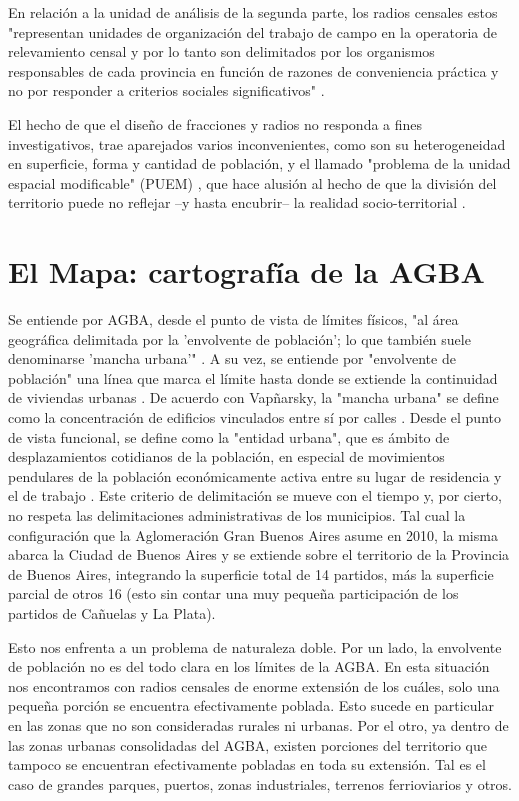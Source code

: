 En relación a la unidad de análisis de la segunda parte, los radios censales estos "representan unidades de organización del trabajo de campo en la operatoria de relevamiento censal y por lo tanto son delimitados por los organismos responsables de cada provincia en función de razones de conveniencia práctica y no por responder a criterios sociales significativos" \cite[p~630]{robirosa} . 

El hecho de que el diseño de fracciones y radios no responda a fines investigativos, trae aparejados varios inconvenientes, como son su heterogeneidad en superficie, forma y cantidad de población, y el llamado "problema de la unidad espacial modificable" (PUEM) \cite{openshaw1977,openshaw1984}, que hace alusión al hecho de que la división del territorio puede no reflejar –y hasta encubrir– la realidad socio-territorial \cite{marcos2012}. 



	\section{El Mapa: cartografía de la AGBA}\label{cap2-mapa}
	
Se entiende por AGBA, desde el punto de vista de límites físicos, "al área geográfica delimitada por la 'envolvente de población'; lo que también suele denominarse 'mancha urbana'" \cite{indec2003e}. A su vez, se entiende por "envolvente de población" una línea que marca el límite hasta donde se extiende la continuidad de viviendas urbanas \cite{indec2003e}. De acuerdo con Vapñarsky, la "mancha urbana" se define como la concentración de edificios vinculados entre sí por calles \cite{vapniarsky1995,vapniarsky1998}. Desde el punto de vista funcional, se define como la "entidad urbana", que es ámbito de desplazamientos cotidianos de la población, en especial de movimientos pendulares de la población económicamente activa entre su lugar de residencia y el de trabajo \cite{bertoncello,torres1990}. Este criterio de delimitación se mueve con el tiempo y, por cierto, no respeta las delimitaciones administrativas de los municipios.  Tal cual la configuración que la Aglomeración Gran Buenos Aires asume en 2010, la misma abarca la Ciudad de Buenos Aires y se extiende sobre el territorio de la Provincia de Buenos Aires, integrando la superficie total de 14 partidos, más la superficie parcial de otros 16 (esto sin contar una muy pequeña participación de los partidos de Cañuelas y La Plata).

Esto nos enfrenta a un problema de naturaleza doble. Por un lado, la envolvente de población no es del todo clara en los límites de la AGBA. En esta situación nos encontramos con radios censales de enorme extensión de los cuáles, solo una pequeña porción se encuentra efectivamente poblada. Esto sucede en particular en las zonas que no son consideradas rurales ni urbanas. Por el otro, ya dentro de las zonas urbanas consolidadas del AGBA, existen porciones del territorio que tampoco se encuentran efectivamente pobladas en toda su extensión. Tal es el caso de grandes parques, puertos, zonas industriales, terrenos ferrioviarios y otros. 

